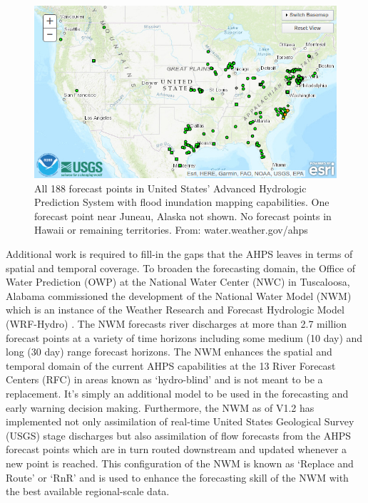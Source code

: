\begin{figure}[h!]
\centering
\includegraphics[scale=2.0]{figs/ahps_fim_forecast_points_conus.jpg}
\caption{All 188 forecast points in United States' Advanced Hydrologic Prediction System with flood inundation mapping capabilities. One forecast point near Juneau, Alaska not shown. No forecast points in Hawaii or remaining territories. From: water.weather.gov/ahps}
\label{fig:fim_ahps_points}
\end{figure}

Additional work is required to fill-in the gaps that the AHPS leaves in terms of spatial and temporal coverage.
To broaden the forecasting domain, the Office of Water Prediction (OWP) at the National Water Center (NWC) in Tuscaloosa, Alabama commissioned the development of the National Water Model (NWM) which is an instance of the Weather Research and Forecast Hydrologic Model (WRF-Hydro) \cite{gochis2018wrf,cosgrove2019evolution}. 
The NWM forecasts river discharges at more than 2.7 million forecast points at a variety of time horizons including some medium (10 day) and long (30 day) range forecast horizons.
The NWM enhances the spatial and temporal domain of the current AHPS capabilities at the 13 River Forecast Centers (RFC) in areas known as `hydro-blind' and is not meant to be a replacement. 
It's simply an additional model to be used in the forecasting and early warning decision making.
Furthermore, the NWM as of V1.2 has implemented not only assimilation of real-time United States Geological Survey (USGS) stage discharges but also assimilation of flow forecasts from the AHPS forecast points which are in turn routed downstream and updated whenever a new point is reached. This configuration of the NWM is known as `Replace and Route' or `RnR' and is used to enhance the forecasting skill of the NWM with the best available regional-scale data.


